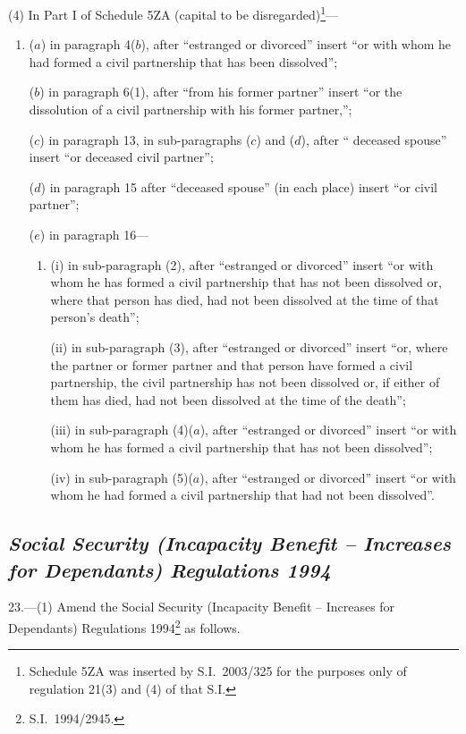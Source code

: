 \documentclass[12pt,a4paper]{article}
\begin{document}
(4) In Part I of Schedule 5ZA (capital to be disregarded)\footnote{Schedule 5ZA was inserted by S.I.\ 2003/325 for the purposes only of regulation 21(3) and (4) of that S.I.}—
\begin{enumerate}\item[]
($a$) in paragraph 4($b$), after “estranged or divorced” insert “or with whom he had formed a civil partnership that has been dissolved”;

($b$) in paragraph 6(1), after “from his former partner” insert “or the dissolution of a civil partnership with his former partner,”;

($c$) in paragraph 13, in sub-paragraphs ($c$)  and ($d$), after “ deceased spouse” insert “or deceased civil partner”;

($d$) in paragraph 15 after “deceased spouse” (in each place) insert “or civil partner”;

($e$) in paragraph 16—
\begin{enumerate}\item[]
(i) in sub-paragraph (2), after “estranged or divorced” insert “or with whom he has formed a civil partnership that has not been dissolved or, where that person has died, had not been dissolved at the time of that person’s death”;

(ii) in sub-paragraph (3), after “estranged or divorced” insert “or, where the partner or former partner and that person have formed a civil partnership, the civil partnership has not been dissolved or, if either of them has died, had not been dissolved at the time of the death”;

(iii) in sub-paragraph (4)($a$), after “estranged or divorced” insert “or with whom he has formed a civil partnership that has not been dissolved”;

(iv) in sub-paragraph (5)($a$), after “estranged or divorced” insert “or with whom he had formed a civil partnership that had not been dissolved”.
\end{enumerate}
\end{enumerate}

\subsection*{\itshape Social Security (Incapacity Benefit – Increases for Dependants) Regulations 1994}

23.---(1)  Amend the Social Security (Incapacity Benefit – Increases for Dependants) Regulations 1994\footnote{S.I.\ 1994/2945.} as follows.
\end{document}
